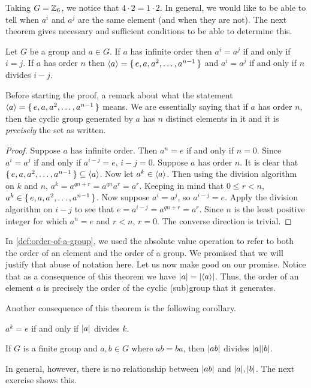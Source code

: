 \documentclass[./algebra-notes.tex]{subfiles}
\begin{document}
Taking $G = \mathbb{Z}_6$, we notice that $4 \cdot 2 = 1 \cdot 2$. In general, we would
like to be able to tell when $a^i$ and $a^j$ are the same element (and when they
are not). The next theorem gives necessary and sufficient conditions to be able
to determine this.

\begin{theorem}
    Let $G$ be a group and $a \in G$. If $a$ has infinite order then $a^i = a^j$
    if and only if $i=j$. If $a$ has order $n$ then ${ \langle a \rangle } = \set{e, a, a^2,
    \dots, a^{n-1}}$ and $a^i = a^j$ if and only if $n$ divides $i-j$.
\end{theorem}
Before starting the proof, a remark about what the statement ${ \langle a \rangle } = \set{e,
a, a^2, \dots, a^{n-1}}$ means. We are essentially saying that if $a$ has order
$n$, then the cyclic group generated by $a$ has $n$ distinct elements in it and
it is \emph{precisely} the set as written.
\begin{proof}
    Suppose $a$ has infinite order. Then $a^n = e$ if and only if $n=0$. Since
    $a^i = a^j$ if and only if $a^{i-j} = e$, $i-j=0$. Suppose $a$ has order
    $n$. It is clear that $\set{e, a, a^2, \dots, a^{n-1}} \subseteq { \langle a \rangle }$.
    Now let $a^k \in { \langle a \rangle }$. Then using the division algorithm on $k$ and $n$,
    $a^k = a^{qn + r} = a^{qn} a^r = a^r$. Keeping in mind that $0 \leq r < n$,
    $a^k \in \set{e, a, a^2, \dots, a^{n-1}}$. Now suppose $a^i = a^j$, so
    $a^{i-j} = e$. Apply the division algorithm on $i-j$ to see that $e =
    a^{i-j} = a^{qn + r} = a^r$. Since $n$ is the least positive integer for
    which $a^n = e$ and $r < n$, $r=0$. The converse direction is trivial.
\end{proof}

In \cref{def:order-of-a-group}, we used the absolute value operation to refer to
both the order of an element and the order of a group. We promised that we will
justify that abuse of notation here. Let us now make good on our promise. Notice
that as a consequence of this theorem we have $\abs{a} = \abs{\gen{a}}$. Thus,
the order of an element $a$ is precisely the order of the cyclic (sub)group that
it generates. 

Another consequence of this theorem is the following corollary.
\begin{corollary}
    $a^k = e$ if and only if $\abs{a}$ divides $k$. 
\end{corollary}

\begin{corollary}
    If $G$ is a finite group and $a, b \in G$ where $ab=ba$, then $\abs{ab}$
    divides $\abs a \abs b$.
\end{corollary}
In general, however, there is no relationship between $\abs{ab}$ and $\abs a,
\abs b$. The next exercise shows this.
\end{document}
